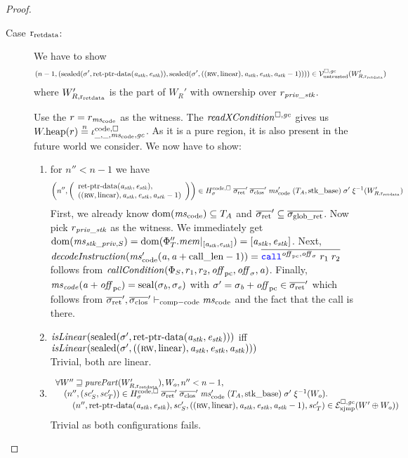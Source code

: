 \begin{proof}
\begin{description}
  \item[Case $\rretd$:] We have to show
    \[
      \npair[n-1]{(\sealed{\sigma',\retptrd(\aaddr_\stk,\eaddr_\stk)},\sealed{\sigma',((\rw,\linear),\aaddr_\stk,\eaddr_\stk,\aaddr_\stk-1)})} \in \lrv(W_{R,\rretd}')
    \]
    where $W_{R,\rretd}'$ is the part of $W_R'$ with ownership over $r_\var{priv\_stk}$.

    Use the $r=r_{\mscode}$ as the witness.
    The $\xReadCond{}$ gives us $\pwheap(r) \nequal \codereg{\_,\_,\mscode,\gc}$.
    As it is a pure region, it is also present in the future world we consider.
    We now have to show:
    \begin{enumerate}[label=\alph*)]
    \item for $n'' < n-1$ we have
      \[\npair[n'']{\left(\array{l}\retptrd(\aaddr_\stk,\eaddr_\stk),\\((\rw,\linear),\aaddr_\stk,\eaddr_\stk,\aaddr_\stk-1)\endarray\right)}
        \in H^\mathrm{code,\square}_\sigma \; \sigrets' \; \sigcloss' \; \mscode'
        \; (\ta,\stkb) \; \sigma' \; \xi^{-1}(W_{R,\rretd}')
      \]
      First, we already know $\dom(\mscode) \subseteq \ta$ and $\sigrets' \subseteq \gsigrets$.
      Now pick $r_\var{priv\_stk}$ as the witness.
      We immediately get $\dom(\ms_{\stk\_\priv,S}) = \dom(\Phi_T''.\mem|_{[\aaddr_\stk,\eaddr_\stk]}) = [\aaddr_\stk,\eaddr_\stk]$.
      Next, $\decInstr{\mscode'(\aaddr,\aaddr+\calllen-1)} = \overline{\scall{\offpc,\offsigma}{r_1}{r_2}}$ follows from $\callCond{\Phi_S,r_1,r_2,\offpc,\offsigma,\aaddr}$.
      Finally, $\ms_\code(\aaddr+\offpc) = \seal{\sigma_\baddr,\sigma_\eaddr}$ with $\sigma' = \sigma_\baddr + \offpc \in \sigrets'$ which follows from $\sigrets',\sigcloss' \vdash_{\mathrm{comp-code}} \mscode$ and the fact that the call is there.
    \item $\isLinear{\sealed{\sigma',\retptrd(\aaddr_\stk,\eaddr_\stk)}}$ iff
      $\isLinear{\sealed{\sigma',((\rw,\linear),\aaddr_\stk,\eaddr_\stk,\aaddr_\stk)}}$\\
      Trivial, both are linear.
    \item
      \[
        \begin{array}{l}
          \forall W'' \future \purePart{W_{R,\rretd}'}, W_o, n'' < n-1,\\
          \quad\npair[n'']{(\vsc_S',\vsc_T')}
          \in  H^\mathrm{code,\square}_\sigma \; \sigrets' \; \sigcloss' \; \mscode'
          \; (\ta,\stkb) \; \sigma' \; \xi^{-1}(W_o) \ldotp \\
          \qquad\npair[n'']{\retptrd(\aaddr_\stk,\eaddr_\stk),\vsc_S',((\rw,\linear),\aaddr_\stk,\eaddr_\stk,\aaddr_\stk-1),\vsc_T'} \in
          \lrexj(W'\oplus W_o))
        \end{array}
      \]
      Trivial as both configurations fails.
    \end{enumerate}


\end{description}
\end{proof}
